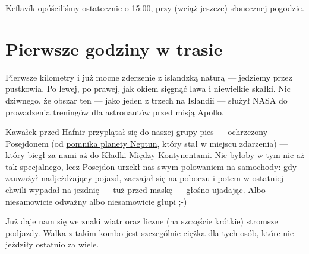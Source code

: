 Keflavík opóściliśmy ostatecznie o 15:00, przy (wciąż jeszcze) słonecznej pogodzie.


\section*{Pierwsze godziny w trasie}

Pierwsze kilometry i już mocne zderzenie z islandzką naturą --- jedziemy przez pustkowia. Po lewej, po prawej, jak okiem sięgnąć lawa i niewielkie skałki. Nic dziwnego, że obszar ten --- jako jeden z trzech na Islandii --- służył NASA do prowadzenia treningów dla astronautów przed misją Apollo.



Kawałek przed Hafnir przyplątał się do naszej grupy pies --- ochrzczony Posejdonem (od \href{https://www.facebook.com/120832791270880/photos/a.612815058739315.1073741825.120832791270880/612815132072641/?type=3&theater}{pomnika planety Neptun}, który stał w miejscu zdarzenia) --- który biegł za nami aż do \href{http://www.visitreykjanes.is/searchresults/attraction/bridge-between-continents}{Kładki Między Kontynentami}. Nie byłoby w tym nic aż tak specjalnego, lecz Posejdon urzekł nas swym polowaniem na samochody: gdy zauważył nadjeżdżający pojazd, zaczajał się na poboczu i potem w ostatniej chwili wypadał na jezdnię --- tuż przed maskę --- głośno ujadając. Albo niesamowicie odważny albo niesamowicie głupi ;-)

Już daje nam się we znaki wiatr oraz liczne (na szczęście krótkie) stromsze podjazdy. Walka z takim kombo jest szczególnie ciężka dla tych osób, które nie jeździły ostatnio za wiele.


